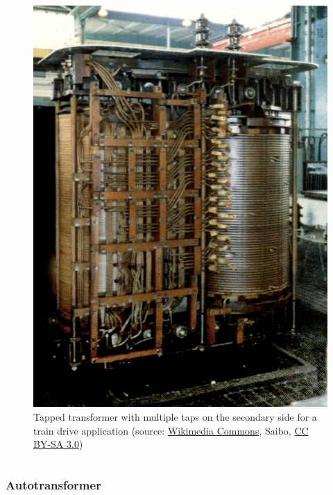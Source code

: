 \begin{frame}
\begin{columns}[b]
\begin{column}{0.55\textwidth}
\begin{figure}
				\includegraphics[height=0.6\textheight]{fig/lec04/Taped_transformer_train_example.jpg}
				\caption{Tapped transformer with multiple taps on the secondary side for a train drive application (source: \href{https://de.wikipedia.org/wiki/Datei:TrafoAW-2.jpg}{Wikimedia Commons}, Saibo, \href{https://creativecommons.org/licenses/by-sa/3.0/deed.en}{CC BY-SA 3.0})}
				\label{fig:Taped_transformer_train_example}
			\end{figure}
		\end{column}
	\end{columns}
\end{frame}

\begin{frame}
	\frametitle{Autotransformer}
\end{frame}

